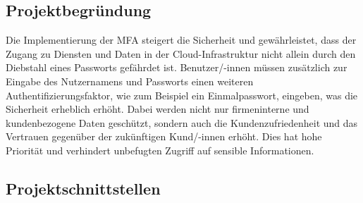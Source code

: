 \subsection{Projektbegründung} 
\label{sec:Projektbegruendung}
Die Implementierung der MFA steigert die Sicherheit und gewährleistet, dass der Zugang zu Diensten und Daten in der 
Cloud-Infrastruktur nicht allein durch den Diebstahl eines Passworts gefährdet ist. Benutzer/-innen müssen zusätzlich zur Eingabe des 
Nutzernamens und Passworts einen weiteren Authentifizierungsfaktor, wie zum Beispiel ein Einmalpasswort, eingeben, 
was die Sicherheit erheblich erhöht. Dabei werden nicht nur firmeninterne und kundenbezogene Daten geschützt, sondern auch 
die Kundenzufriedenheit und das Vertrauen gegenüber der zukünftigen Kund/-innen erhöht. Dies hat hohe Priorität und verhindert 
unbefugten Zugriff auf sensible Informationen.


\subsection{Projektschnittstellen} 
\label{sec:Projektschnittstellen}

